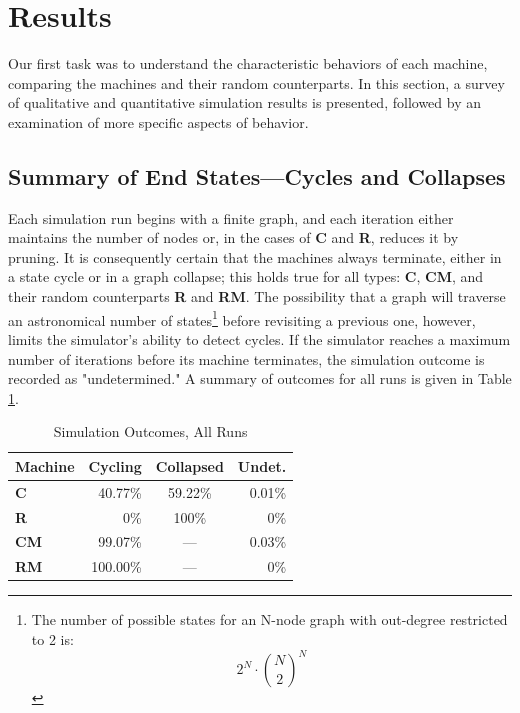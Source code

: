 \documentclass{tufte-handout}
\begin{document}
{%

\section{Results}

Our first task was to understand the characteristic behaviors of each
machine, comparing the machines and their random counterparts.
In this section, a survey of qualitative and quantitative simulation results is
presented, followed by an examination of more specific aspects of behavior.

\subsection{Summary of End States---Cycles and Collapses}

Each simulation run begins with a finite graph, and each iteration
either maintains the number of nodes or, in the cases of \textbf{C} and \textbf{R},
reduces it by pruning.  It is consequently certain that the machines always terminate,
either in a state cycle or in a graph collapse; this holds true
for all types: \textbf{C}, \textbf{CM}, and their random counterparts \textbf{R} and \textbf{RM}.
The possibility that a graph will traverse an astronomical number
of states\footnote{The number of possible states for an N-node graph with
out-degree restricted to 2 is:
\[
2^N\cdot\binom{N}{2}^N
\]
}
before revisiting a previous one, however, limits the simulator's ability to
detect cycles. If the simulator reaches a maximum number of iterations
before its machine terminates, the simulation outcome is recorded as "undetermined."
A summary of outcomes for all runs is given in Table \ref{tab:Tab2}.

\begin{table}
\caption{Simulation Outcomes, All Runs}
\centering
\begin{tabular}{lrcr}
\toprule
Machine & Cycling & Collapsed & Undet. \\
\midrule
\textbf{C} & 40.77\% & 59.22\% & 0.01\% \\
\textbf{R} & 0\% & 100\% & 0\% \\
\cmidrule(r){2-4}
\textbf{CM} & 99.07\% & --- & 0.03\% \\
\textbf{RM} & 100.00\% & --- & 0\% \\
\bottomrule
\end{tabular}
\label{tab:Tab2}
\end{table}
\vspace{3mm}

}
\end{document}

